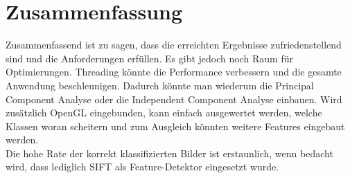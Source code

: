 \documentclass[liststotoc,11pt,a4paper]{article}
\begin{document}
 


\section{Zusammenfassung}
Zusammenfassend ist zu sagen, dass die erreichten Ergebnisse zufriedenstellend sind und die Anforderungen erfüllen. Es gibt jedoch noch Raum für Optimierungen. Threading könnte die Performance verbessern und die gesamte Anwendung beschleunigen. Dadurch könnte man wiederum die Principal Component Analyse oder die Independent Component Analyse einbauen. 
Wird zusätzlich OpenGL eingebunden, kann einfach ausgewertet werden, welche Klassen woran scheitern und zum Ausgleich könnten weitere Features eingebaut werden.
\\Die hohe Rate der korrekt klassifizierten Bilder ist erstaunlich, wenn bedacht wird, dass lediglich SIFT als Feature-Detektor eingesetzt wurde.



\newpage
{}
\setcounter{page}{3}
\renewcommand{\refname}{Referenzen}

\end{document}
